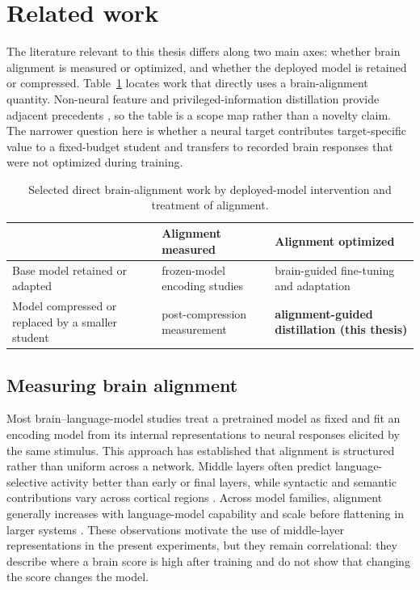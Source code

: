 \section{Related work}

The literature relevant to this thesis differs along two main axes: whether brain alignment is measured or optimized, and whether the deployed model is retained or compressed.
Table~\ref{tab:cells} locates work that directly uses a brain-alignment quantity.
Non-neural feature and privileged-information distillation provide adjacent precedents \autocite{saadi2025,wu2026}, so the table is a scope map rather than a novelty claim.
The narrower question here is whether a neural target contributes target-specific value to a fixed-budget student and transfers to recorded brain responses that were not optimized during training.

\begin{table}[H]
  \centering
  \footnotesize
  \caption{Selected direct brain-alignment work by deployed-model intervention and treatment of alignment.}
  \label{tab:cells}
  \begin{tabular}{@{}p{}p{}p{}@{}}
    \toprule
                       & Alignment measured & Alignment optimized \\
    \midrule
    \raggedright Base model retained or adapted & \raggedright frozen-model encoding studies \autocite{oota2023,gao2024,alkhamissi2025} & \raggedright brain-guided fine-tuning and adaptation \autocite{moussa2025,merlinData2026,vaidya2026,xiao2026} \tabularnewline
    \raggedright Model compressed or replaced by a smaller student & \raggedright post-compression measurement \autocite{oota2026} & \raggedright \textbf{alignment-guided distillation (this thesis)} \tabularnewline
    \bottomrule
  \end{tabular}
\end{table}

\subsection{Measuring brain alignment}

Most brain--language-model studies treat a pretrained model as fixed and fit an encoding model from its internal representations to neural responses elicited by the same stimulus.
This approach has established that alignment is structured rather than uniform across a network.
Middle layers often predict language-selective activity better than early or final layers, while syntactic and semantic contributions vary across cortical regions \autocite{oota2023,oota2024}.
Across model families, alignment generally increases with language-model capability and scale before flattening in larger systems \autocite{gao2024,alkhamissi2025}.
These observations motivate the use of middle-layer representations in the present experiments, but they remain correlational: they describe where a brain score is high after training and do not show that changing the score changes the model.

